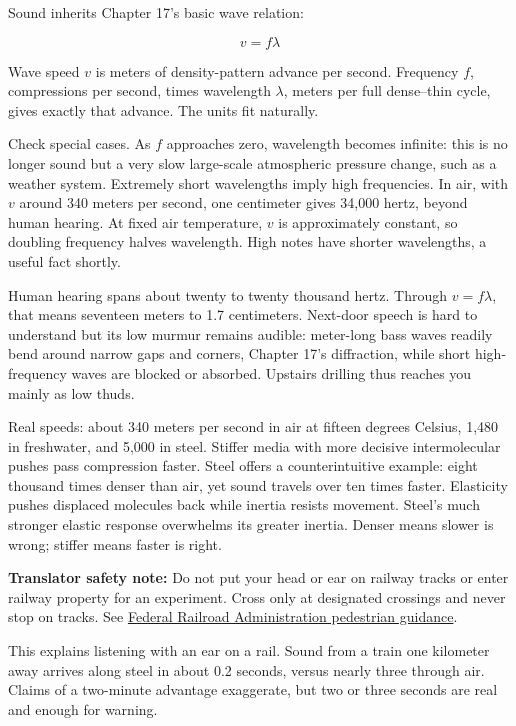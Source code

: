 
\begin{mainline}
Sound inherits Chapter 17's basic wave relation:

\[
  v = f\lambda
\]

Wave speed \(v\) is meters of density-pattern advance per second. Frequency \(f\), compressions per second, times wavelength \(\lambda\), meters per full dense--thin cycle, gives exactly that advance. The units fit naturally.

Check special cases. As \(f\) approaches zero, wavelength becomes infinite: this is no longer sound but a very slow large-scale atmospheric pressure change, such as a weather system. Extremely short wavelengths imply high frequencies. In air, with \(v\) around 340 meters per second, one centimeter gives 34,000 hertz, beyond human hearing. At fixed air temperature, \(v\) is approximately constant, so doubling frequency halves wavelength. High notes have shorter wavelengths, a useful fact shortly.

Human hearing spans about twenty to twenty thousand hertz. Through \(v=f\lambda\), that means seventeen meters to 1.7 centimeters. Next-door speech is hard to understand but its low murmur remains audible: meter-long bass waves readily bend around narrow gaps and corners, Chapter 17's diffraction, while short high-frequency waves are blocked or absorbed. Upstairs drilling thus reaches you mainly as low thuds.

Real speeds: about 340 meters per second in air at fifteen degrees Celsius, 1,480 in freshwater, and 5,000 in steel. Stiffer media with more decisive intermolecular pushes pass compression faster. Steel offers a counterintuitive example: eight thousand times denser than air, yet sound travels over ten times faster. Elasticity pushes displaced molecules back while inertia resists movement. Steel's much stronger elastic response overwhelms its greater inertia. Denser means slower is wrong; stiffer means faster is right.

\textbf{Translator safety note:} Do not put your head or ear on railway tracks or enter railway property for an experiment. Cross only at designated crossings and never stop on tracks. See \href{https://www.fra.dot.gov/Page/P0843}{Federal Railroad Administration pedestrian guidance}.

This explains listening with an ear on a rail. Sound from a train one kilometer away arrives along steel in about 0.2 seconds, versus nearly three through air. Claims of a two-minute advantage exaggerate, but two or three seconds are real and enough for warning.


\end{mainline}
